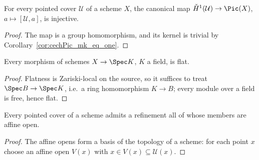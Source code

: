 \begin{corollary}
  \label{cor:cechPic_mk_injective}
  \leanok
  For every pointed cover \(\mathcal U\) of a scheme \(X\), the canonical map
  \(\check H^1(\mathcal U) \to \Pic(X)\), \(a \mapsto [\mathcal U, a]\), is injective.
\end{corollary}
\begin{proof}
  \leanok
  The map is a group homomorphism, and its kernel is trivial by
  Corollary~\ref{cor:cechPic_mk_eq_one}.
\end{proof}

\begin{lemma}
  \label{lem:flat_of_field}
  \leanok
  Every morphism of schemes \(X \to \Spec K\), \(K\) a field, is flat.
\end{lemma}
\begin{proof}
  \leanok
  Flatness is Zariski-local on the source, so it suffices to treat
  \(\Spec B \to \Spec K\), i.e.\ a ring homomorphism \(K \to B\); every module over a field
  is free, hence flat.
\end{proof}

\begin{lemma}
  \label{lem:pointedCover_affine_refinement}
  \leanok
  Every pointed cover of a scheme admits a refinement all of whose members are affine open.
\end{lemma}
\begin{proof}
  \leanok
  The affine opens form a basis of the topology of a scheme: for each point \(x\) choose an
  affine open \(V(x)\) with \(x \in V(x) \subseteq \mathcal U(x)\).
\end{proof}

